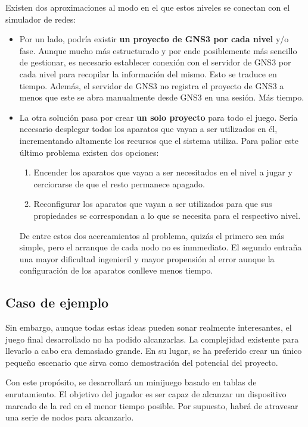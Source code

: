 Existen dos aproximaciones al modo en el que estos niveles se conectan con el simulador de redes:
\begin{itemize}
\item Por un lado, podría existir \textbf{un proyecto de GNS3 por cada nivel} y/o fase. Aunque mucho más estructurado y por ende posiblemente más sencillo de gestionar, es necesario establecer conexión con el servidor de GNS3 por cada nivel para recopilar la información del mismo. Esto se traduce en tiempo. Además, el servidor de GNS3 no registra el proyecto de GNS3 a menos que este se abra manualmente desde GNS3 en una sesión. Más tiempo.
\item La otra solución pasa por crear \textbf{un solo proyecto} para todo el juego. Sería necesario desplegar todos los aparatos que vayan a ser utilizados en él, incrementando altamente los recursos que el sistema utiliza. Para paliar este último problema existen dos opciones:
\begin{enumerate}
\item Encender los aparatos que vayan a ser necesitados en el nivel a jugar y cerciorarse de que el resto permanece apagado.
\item Reconfigurar los aparatos que vayan a ser utilizados para que sus propiedades se correspondan a lo que se necesita para el respectivo nivel.
\end{enumerate}
De entre estos dos acercamientos al problema, quizás el primero sea más simple, pero el arranque de cada nodo no es inmmediato. El segundo entraña una mayor dificultad ingenieril y mayor propensión al error aunque la configuración de los aparatos conlleve menos tiempo.
\end{itemize}

\subsection{Caso de ejemplo}\label{subsec:fracasojuego}

Sin embargo, aunque todas estas ideas pueden sonar realmente interesantes, el juego final desarrollado no ha podido alcanzarlas. La complejidad existente para llevarlo a cabo era demasiado grande. En su lugar, se ha preferido crear un único pequeño escenario que sirva como demostración del potencial del proyecto.

Con este propósito, se desarrollará un minijuego basado en tablas de enrutamiento. El objetivo del jugador es ser capaz de alcanzar un dispositivo marcado de la red en el menor tiempo posible. Por supuesto, habrá de atravesar una serie de nodos para alcanzarlo.

